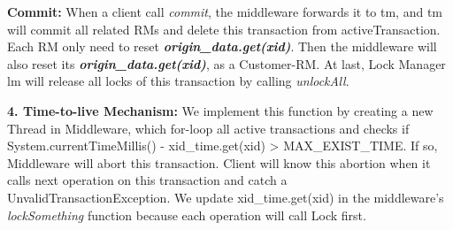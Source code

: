 \documentclass[a4paper, 11pt]{ctexart}
\newcommand{\newQuestion}[1]{\vspace{5pt}\textbf{\Large #1}}
\begin{document}
\textbf{Commit:} When a client call \textit{commit}, the middleware forwards it to tm, and tm will commit all related RMs and delete this transaction from activeTransaction. Each RM only need to reset \textbf{\textit{origin\_data.get(xid)}}. Then the middleware will also reset its \textbf{\textit{origin\_data.get(xid)}}, as a Customer-RM. At last, Lock Manager lm will release all locks of this transaction by calling \textit{unlockAll}.

\newQuestion{4. Time-to-live Mechanism:} We implement this function by creating a new Thread in Middleware, which for-loop all active transactions and checks if System.currentTimeMillis() - xid\_time.get(xid) > MAX\_EXIST\_TIME. If so, Middleware will abort this transaction. Client will know this abortion when it calls next operation on this transaction and catch a UnvalidTransactionException. We update xid\_time.get(xid) in the middleware's \textit{lockSomething} function because each operation will call Lock first.
\end{document}
